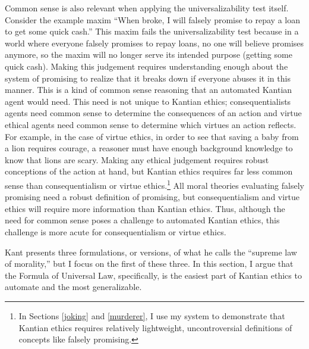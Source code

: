 \begin{isabellebody}
\begin{isamarkuptext}
Common sense is also relevant when applying the universalizability test itself. Consider the example
maxim ``When broke, I will falsely promise to repay a loan
to get some quick cash.'' This maxim fails the universalizability test because in a world where everyone
falsely promises to repay loans, no one will believe promises anymore, so the maxim will no longer serve
its intended purpose (getting some quick cash). Making this judgement requires understanding enough about
the system of promising to realize that it breaks down if everyone abuses it in this manner. This is a
kind of common sense reasoning that an automated Kantian agent would need. This need is not unique to
Kantian ethics; consequentialists agents need common sense to determine the consequences of 
an action and virtue ethical agents need common sense to determine which virtues an action
reflects. For example, in the case of virtue ethics, in order to see that saving a baby from a lion 
requires courage, a reasoner must have enough background knowledge to know that lions are scary. Making any 
ethical judgement requires robust conceptions of the action at hand, but Kantian ethics requires far less common sense 
than consequentialism or virtue ethics.\footnote{
In Sections \ref{joking} and \ref{murderer}, I use my system to demonstrate that Kantian ethics requires relatively lightweight, uncontroversial definitions 
of concepts like falsely promising.} All moral theories evaluating falsely promising need a robust 
definition of promising, but consequentialism and virtue ethics will require more information than Kantian ethics.
Thus, although the need for common sense poses a challenge to automated
Kantian ethics, this challenge is more acute for consequentialism or virtue ethics.%
\end{isamarkuptext}\isamarkuptrue%
%
\isadelimdocument
%
\endisadelimdocument
%
\isatagdocument
%
\isamarkuptrue%
%
\endisatagdocument
{\isafolddocument}%
%
\isadelimdocument
%
\endisadelimdocument
%
\begin{isamarkuptext}%
Kant presents three formulations, or versions, 
of what he calls the ``supreme law of morality,'' but I focus on the first of these three. In this section, 
I argue that the Formula of Universal Law, specifically, is the easiest part of Kantian ethics to automate
and the most generalizable.


\end{isamarkuptext}
\end{isabellebody}
